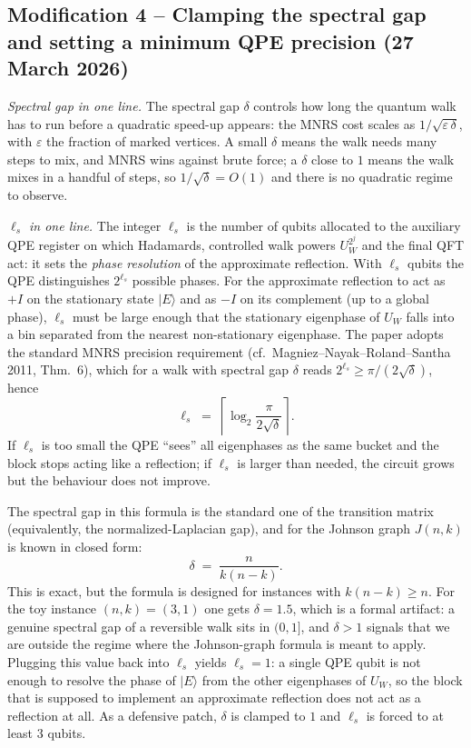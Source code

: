 \documentclass[11pt,a4paper]{article}
\begin{document}
\subsection*{Modification 4 -- Clamping the spectral gap and setting a
minimum QPE precision (27 March 2026)}

\emph{Spectral gap in one line.} The spectral gap $\delta$ controls
how long the quantum walk has to run before a quadratic speed-up
appears: the MNRS cost scales as $1/\sqrt{\varepsilon\,\delta}$, with
$\varepsilon$ the fraction of marked vertices. A small $\delta$ means
the walk needs many steps to mix, and MNRS wins against brute force;
a $\delta$ close to $1$ means the walk mixes in a handful of steps, so
$1/\sqrt{\delta} = O(1)$ and there is no quadratic regime to observe.

\emph{$\ell_s$ in one line.} The integer $\ell_s$ is the number of
qubits allocated to the auxiliary QPE register on which Hadamards,
controlled walk powers $U_W^{2^j}$ and the final QFT act: it sets
the \emph{phase resolution} of the approximate reflection. With
$\ell_s$ qubits the QPE distinguishes $2^{\ell_s}$ possible phases.
For the approximate reflection to act as $+I$ on the stationary
state $|E\rangle$ and as $-I$ on its complement (up to a global
phase), $\ell_s$ must be large enough that the stationary eigenphase
of $U_W$ falls into a bin separated from the nearest non-stationary
eigenphase. The paper adopts the standard MNRS precision requirement
(cf.\ Magniez--Nayak--Roland--Santha 2011, Thm.~6), which for a
walk with spectral gap $\delta$ reads $2^{\ell_s} \ge
\pi / (2\sqrt{\delta})$, hence
\[
\ell_s \;=\; \left\lceil \log_2\!\frac{\pi}{2\sqrt{\delta}} \right\rceil.
\]
If $\ell_s$ is too small the QPE ``sees'' all eigenphases as the same
bucket and the block stops acting like a reflection; if $\ell_s$ is
larger than needed, the circuit grows but the behaviour does not
improve.

The spectral gap in this formula is the standard one of the
transition matrix (equivalently, the normalized-Laplacian gap), and
for the Johnson graph $J(n,k)$ is known in closed form:
\[
\delta \;=\; \frac{n}{k(n-k)}.
\]
This is exact, but the formula is designed for instances with
$k(n-k)\ge n$. For the toy instance $(n,k)=(3,1)$ one gets
$\delta = 1.5$, which is a formal artifact: a genuine spectral gap
of a reversible walk sits in $(0,1]$, and $\delta>1$ signals that we
are outside the regime where the Johnson-graph formula is meant to
apply. Plugging this value back into $\ell_s$ yields $\ell_s=1$: a
single QPE qubit is not enough to resolve the phase of $|E\rangle$
from the other eigenphases of $U_W$, so the block that is supposed
to implement an approximate reflection does not act as a reflection
at all. As a defensive patch, $\delta$ is clamped to $1$ and
$\ell_s$ is forced to at least $3$ qubits.
\end{document}
